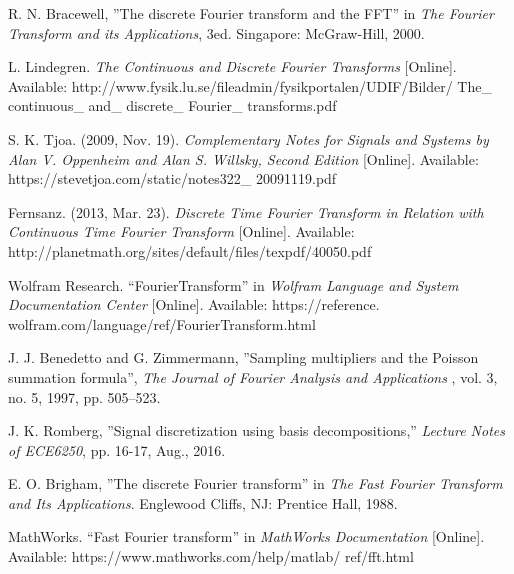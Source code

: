 \documentclass[journal,twoside]{IEEEtran}
\begin{document}
\begin{thebibliography}{10}

R. N. Bracewell, ''The discrete Fourier transform and the FFT'' in \emph{The Fourier Transform and its Applications}, 3ed. Singapore: McGraw-Hill, 2000.

L. Lindegren. \emph{The Continuous and Discrete Fourier Transforms} [Online]. Available: http://www.fysik.lu.se/fileadmin/fysikportalen/UDIF/Bilder/
The\_ continuous\_ and\_ discrete\_ Fourier\_ transforms.pdf

S. K. Tjoa. (2009, Nov. 19). \emph{Complementary Notes for Signals and Systems by Alan V. Oppenheim and Alan S. Willsky, Second Edition} [Online]. Available: https://stevetjoa.com/static/notes322\_ 20091119.pdf

Fernsanz. (2013, Mar. 23). \emph{Discrete Time Fourier Transform in Relation with Continuous Time Fourier Transform} [Online]. Available: http://planetmath.org/sites/default/files/texpdf/40050.pdf

Wolfram Research. ``FourierTransform'' in \emph{Wolfram Language and System Documentation Center} [Online]. Available: https://reference.
wolfram.com/language/ref/FourierTransform.html

J. J. Benedetto and G. Zimmermann, ''Sampling multipliers and the Poisson summation formula'', \emph{The Journal of Fourier Analysis and Applications} , vol. 3, no. 5, 1997, pp. 505–523.

J. K. Romberg, ''Signal discretization using basis decompositions,'' \emph{Lecture Notes of ECE6250}, pp. 16-17, Aug., 2016.

E. O. Brigham, ''The discrete Fourier transform'' in \emph{The Fast Fourier Transform and Its Applications}. Englewood Cliffs, NJ: Prentice Hall, 1988.

MathWorks. ``Fast Fourier transform'' in \emph{MathWorks Documentation} [Online]. Available: https://www.mathworks.com/help/matlab/
ref/fft.html

\end{thebibliography}
\end{document}
